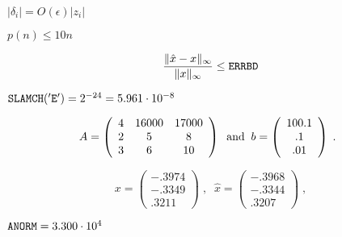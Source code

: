 {\newpage\clearpage
{}%
$| \delta_{i} | = O( \epsilon ) | z_{i} |$%
\lthtmlinlinemathZ
\lthtmlcheckvsize\clearpage}

{\newpage\clearpage
{}%
$p(n) \leq 10n$%
\lthtmlinlinemathZ
\lthtmlcheckvsize\clearpage}

\setcounter{footnoteapproxerrorbound}{10}
{\newpage\clearpage
{}%
\begin{displaymath}
\frac{\| \hat{x} - x \|_{\infty}}{\|x\|_{\infty}} \leq {\tt ERRBD}
\end{displaymath}%
\lthtmldisplayZ
\lthtmlcheckvsize\clearpage}

\setcounter{footnoteDEC5000}{11}
{\newpage\clearpage
{}%
${\tt SLAMCH('E')} = 2^{-24} = 5.961 \cdot 10^{-8}$%
\lthtmlinlinemathZ
\lthtmlcheckvsize\clearpage}

{\newpage\clearpage
{}%
\begin{displaymath}
A = \left( \begin{array}{ccc} 4 & 16000 & 17000 \\2 & 5 & 8 \\3 & 6 & 10 \end{array} \right) 
\; \; {\rm and} \; \;
b = \left( \begin{array}{c} 100.1 \\.1 \\.01 \end{array} \right) \; . \; \;
\end{displaymath}%
\lthtmldisplayZ
\lthtmlcheckvsize\clearpage}

{\newpage\clearpage
{}%
\begin{displaymath}
x = \left( \begin{array}{c} -.3974 \\-.3349 \\.3211 \end{array} \right) \; , \; \;
\hat{x} = \left( \begin{array}{c} -.3968 \\-.3344 \\.3207 \end{array} \right) \; ,
\end{displaymath}%
\lthtmldisplayZ
\lthtmlcheckvsize\clearpage}

{\newpage\clearpage
{}%
${\tt ANORM} = 3.300 \cdot 10^4$%
\lthtmlinlinemathZ
\lthtmlcheckvsize\clearpage}

